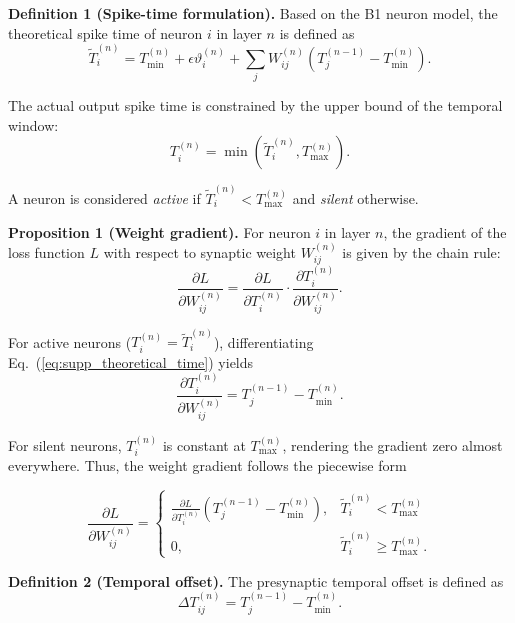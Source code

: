 \documentclass[12pt]{article}
\begin{document}
\textbf{Definition 1 (Spike-time formulation).}
Based on the B1 neuron model, the theoretical spike time of neuron $i$ in layer $n$ is defined as
\begin{equation}
\tilde{T}_i^{(n)} =
T_{\min}^{(n)} +
\epsilon \vartheta_i^{(n)} +
\sum_j W_{ij}^{(n)}
\left(
T_j^{(n-1)} - T_{\min}^{(n)}
\right).
\label{eq:supp_theoretical_time}
\end{equation}

The actual output spike time is constrained by the upper bound of the temporal window:
\begin{equation}
T_i^{(n)} =
\min(\tilde{T}_i^{(n)}, T_{\max}^{(n)}).
\label{eq:supp_actual_time}
\end{equation}

A neuron is considered \emph{active} if $\tilde{T}_i^{(n)} < T_{\max}^{(n)}$ and \emph{silent} otherwise.

\textbf{Proposition 1 (Weight gradient).}
For neuron $i$ in layer $n$, the gradient of the loss function $L$ with respect to synaptic weight $W_{ij}^{(n)}$ is given by the chain rule:
\begin{equation}
\frac{\partial L}{\partial W_{ij}^{(n)}} =
\frac{\partial L}{\partial T_i^{(n)}}
\cdot
\frac{\partial T_i^{(n)}}{\partial W_{ij}^{(n)}}.
\label{eq:supp_chain_rule}
\end{equation}

For active neurons ($T_i^{(n)}=\tilde{T}_i^{(n)}$), differentiating Eq.~(\ref{eq:supp_theoretical_time}) yields
\[
\frac{\partial T_i^{(n)}}{\partial W_{ij}^{(n)}} =
T_j^{(n-1)} - T_{\min}^{(n)}.
\]

For silent neurons, $T_i^{(n)}$ is constant at $T_{\max}^{(n)}$, rendering the gradient zero almost everywhere. Thus, the weight gradient follows the piecewise form

\begin{equation}
\frac{\partial L}{\partial W_{ij}^{(n)}} =
\begin{cases}
\displaystyle
\frac{\partial L}{\partial T_i^{(n)}}
\left(
T_j^{(n-1)} - T_{\min}^{(n)}
\right),
& \tilde{T}_i^{(n)} < T_{\max}^{(n)} \\[1.0ex]
0,
& \tilde{T}_i^{(n)} \ge T_{\max}^{(n)}.
\end{cases}
\label{eq:supp_gradient_piecewise}
\end{equation}

\textbf{Definition 2 (Temporal offset).}
The presynaptic temporal offset is defined as
\[
\Delta T_{ij}^{(n)} = T_j^{(n-1)} - T_{\min}^{(n)}.
\]
\end{document}
